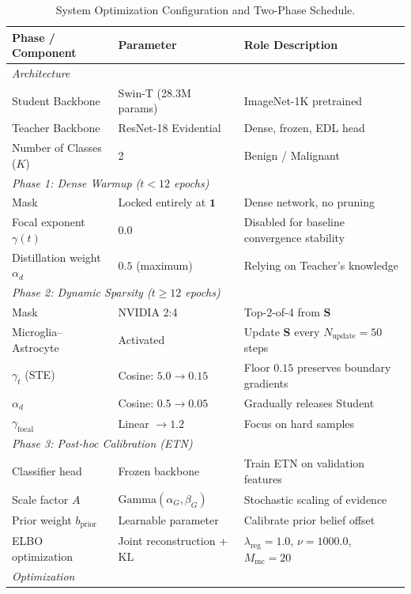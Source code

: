 \documentclass[letterpaper]{article} %
\begin{document}
\begin{table}[t]
\centering
\caption{System Optimization Configuration and Two-Phase Schedule.}
\label{tab:config}
\begin{tabular}{@{}lll@{}}
\toprule
\textbf{Phase / Component} & \textbf{Parameter} & \textbf{Role Description} \\
\midrule
\multicolumn{3}{l}{\emph{Architecture}} \\
Student Backbone & Swin-T (28.3M params) & ImageNet-1K pretrained \\
Teacher Backbone & ResNet-18 Evidential & Dense, frozen, EDL head \\
Number of Classes ($K$) & 2 & Benign / Malignant \\
\midrule
\multicolumn{3}{l}{\emph{Phase 1: Dense Warmup ($t < 12$ epochs)}} \\
Mask & Locked entirely at $\bm{1}$ & Dense network, no pruning \\
Focal exponent $\gamma(t)$ & $0.0$ & Disabled for baseline convergence stability \\
Distillation weight $\alpha_d$ & $0.5$ (maximum) & Relying on Teacher's knowledge \\
\midrule
\multicolumn{3}{l}{\emph{Phase 2: Dynamic Sparsity ($t \ge 12$ epochs)}} \\
Mask & NVIDIA 2:4 & Top-2-of-4 from $\bm{S}$ \\
Microglia--Astrocyte & Activated & Update $\bm{S}$ every $N_{\text{update}} = 50$ steps \\
$\gamma_t$ (STE) & Cosine: $5.0 \to 0.15$ & Floor $0.15$ preserves boundary gradients \\
$\alpha_d$ & Cosine: $0.5 \to 0.05$ & Gradually releases Student \\
$\gamma_{\text{focal}}$ & Linear $\to 1.2$ & Focus on hard samples \\
\midrule
\multicolumn{3}{l}{\emph{Phase 3: Post-hoc Calibration (ETN)}} \\
Classifier head & Frozen backbone & Train ETN on validation features \\
Scale factor $A$ & $\text{Gamma}(\alpha_G, \beta_G)$ & Stochastic scaling of evidence \\
Prior weight $b_{\text{prior}}$ & Learnable parameter & Calibrate prior belief offset \\
ELBO optimization & Joint reconstruction + KL & $\lambda_{\text{reg}}=1.0$, $\nu=1000.0$, $M_{\text{mc}}=20$ \\
\midrule
\multicolumn{3}{l}{\emph{Optimization}} \\

\end{tabular}
\end{table}
\end{document}
